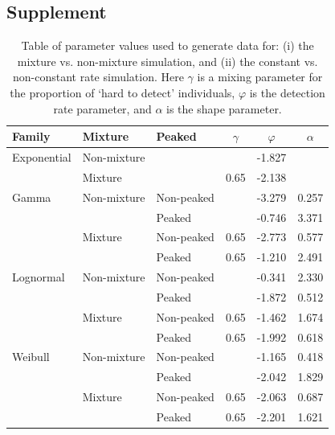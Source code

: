 \documentclass[useAMS,usenatbib,referee,12pt]{article}
\begin{document}
\begin{appendix}
\section{Supplement}

\begin{table}[!ht]
\centering
\begin{tabular}{lll|ccc}
  \hline
Family & Mixture & Peaked & $\gamma$ & $\varphi$ & $\alpha$ \\ 
  \hline
Exponential & Non-mixture & &  & -1.827 &  \\ 
  & Mixture & & 0.65 & -2.138 &  \\ 
  \hline
  Gamma & Non-mixture & Non-peaked &  & -3.279 & 0.257 \\ 
  & & Peaked &  & -0.746 & 3.371 \\ 
  & Mixture & Non-peaked & 0.65 & -2.773 & 0.577 \\ 
  & & Peaked & 0.65 & -1.210 & 2.491 \\ 
  \hline
  Lognormal & Non-mixture & Non-peaked &  & -0.341 & 2.330 \\ 
  & & Peaked &  & -1.872 & 0.512 \\ 
  & Mixture & Non-peaked & 0.65 & -1.462 & 1.674 \\ 
  & & Peaked & 0.65 & -1.992 & 0.618 \\ 
  \hline
  Weibull & Non-mixture & Non-peaked &  & -1.165 & 0.418 \\ 
  & & Peaked &  & -2.042 & 1.829 \\ 
  & Mixture & Non-peaked & 0.65 & -2.063 & 0.687 \\ 
  & & Peaked & 0.65 & -2.201 & 1.621 \\ 
   \hline
\end{tabular}
\caption{Table of parameter values used to generate data for: (i) the mixture vs. non-mixture simulation, and (ii) the constant vs. non-constant rate simulation.  Here $\gamma$ is a mixing parameter for the proportion of `hard to detect' individuals, $\varphi$ is the detection rate parameter, and $\alpha$ is the shape parameter.}
\end{table}


\end{appendix}
\end{document}
